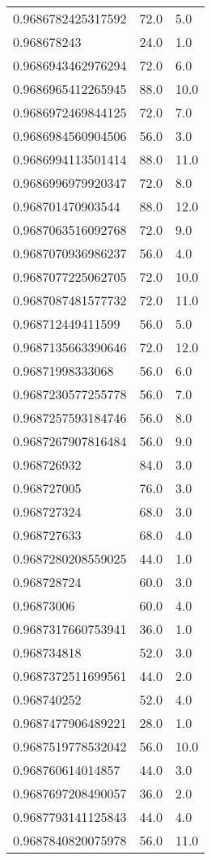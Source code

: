 \begin{center}
\begin{supertabular}[H]{p{0.30\textwidth}p{0.05\textwidth}p{0.05\textwidth}}
0.9686782425317592 & 72.0 & 5.0 \\ 
0.968678243 & 24.0 & 1.0 \\ 
0.9686943462976294 & 72.0 & 6.0 \\ 
0.9686965412265945 & 88.0 & 10.0 \\ 
0.9686972469844125 & 72.0 & 7.0 \\ 
0.9686984560904506 & 56.0 & 3.0 \\ 
0.9686994113501414 & 88.0 & 11.0 \\ 
0.9686996979920347 & 72.0 & 8.0 \\ 
0.968701470903544 & 88.0 & 12.0 \\ 
0.9687063516092768 & 72.0 & 9.0 \\ 
0.9687070936986237 & 56.0 & 4.0 \\ 
0.9687077225062705 & 72.0 & 10.0 \\ 
0.9687087481577732 & 72.0 & 11.0 \\ 
0.968712449411599 & 56.0 & 5.0 \\ 
0.9687135663390646 & 72.0 & 12.0 \\ 
0.96871998333068 & 56.0 & 6.0 \\ 
0.9687230577255778 & 56.0 & 7.0 \\ 
0.9687257593184746 & 56.0 & 8.0 \\ 
0.9687267907816484 & 56.0 & 9.0 \\ 
0.968726932 & 84.0 & 3.0 \\ 
0.968727005 & 76.0 & 3.0 \\ 
0.968727324 & 68.0 & 3.0 \\ 
0.968727633 & 68.0 & 4.0 \\ 
0.9687280208559025 & 44.0 & 1.0 \\ 
0.968728724 & 60.0 & 3.0 \\ 
0.96873006 & 60.0 & 4.0 \\ 
0.9687317660753941 & 36.0 & 1.0 \\ 
0.968734818 & 52.0 & 3.0 \\ 
0.9687372511699561 & 44.0 & 2.0 \\ 
0.968740252 & 52.0 & 4.0 \\ 
0.9687477906489221 & 28.0 & 1.0 \\ 
0.9687519778532042 & 56.0 & 10.0 \\ 
0.968760614014857 & 44.0 & 3.0 \\ 
0.9687697208490057 & 36.0 & 2.0 \\ 
0.9687793141125843 & 44.0 & 4.0 \\ 
0.9687840820075978 & 56.0 & 11.0 \\ 

\end{supertabular}
\end{center}
